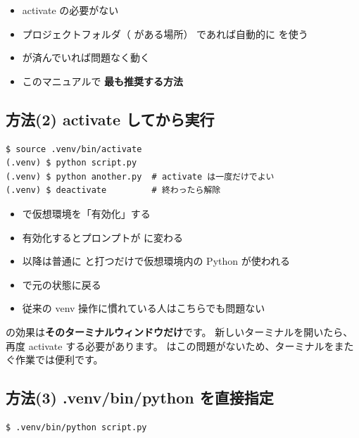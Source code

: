\begin{itemize}
  \item activate の必要がない
  \item プロジェクトフォルダ（ がある場所）
    であれば自動的に  を使う
  \item {} が済んでいれば問題なく動く
  \item このマニュアルで \textbf{最も推奨する方法}
\end{itemize}

\subsection{方法(2) activate してから実行}

\begin{wslbox}
\begin{lstlisting}[style=bash]
$ source .venv/bin/activate
(.venv) $ python script.py
(.venv) $ python another.py  # activate は一度だけでよい
(.venv) $ deactivate         # 終わったら解除
\end{lstlisting}
\end{wslbox}

\begin{itemize}
  \item {} で仮想環境を「有効化」する
  \item 有効化するとプロンプトが  に変わる
  \item 以降は普通に  と打つだけで仮想環境内の Python が使われる
  \item {} で元の状態に戻る
  \item 従来の venv 操作に慣れている人はこちらでも問題ない
\end{itemize}

\begin{notebox}
 の効果は\textbf{そのターミナルウィンドウだけ}です。
新しいターミナルを開いたら、再度 activate する必要があります。
 はこの問題がないため、ターミナルをまたぐ作業では便利です。
\end{notebox}

\subsection{方法(3) .venv/bin/python を直接指定}

\begin{wslbox}[方法(3)：パスを直接指定]
\begin{lstlisting}[style=bash]
$ .venv/bin/python script.py
\end{lstlisting}
\end{wslbox}

